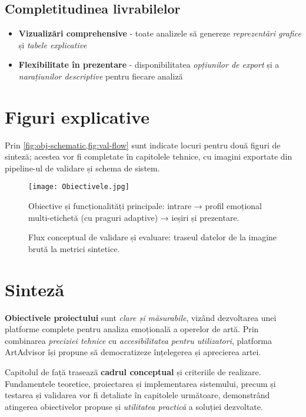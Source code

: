 \subsection{Completitudinea livrabilelor}
\begin{itemize}
  \item \textbf{Vizualizări comprehensive} - toate analizele să genereze \emph{reprezentări grafice} și \textit{tabele explicative}
  \item \textbf{Flexibilitate în prezentare} - disponibilitatea \emph{opțiunilor de export} și a \textit{narațiunilor descriptive} pentru fiecare analiză
\end{itemize}

\section{Figuri explicative}
\label{sec:figuri-explicative}

Prin \cref{fig:obj-schematic,fig:val-flow} sunt indicate locuri pentru două figuri de sinteză; acestea vor fi completate în capitolele tehnice, cu imagini exportate din pipeline-ul de validare și schema de sistem.

\begin{figure}[htbp]
  \centering
  \texttt{[image: Obiectivele.jpg]}
  \caption{Obiective și funcționalități principale: intrare → profil emoțional multi-etichetă (cu praguri adaptive) → ieșiri și prezentare.}
  \label{fig:obj-schematic}
\end{figure}

\begin{figure}[htbp]
  \centering
  \caption{Flux conceptual de validare și evaluare: traseul datelor de la imagine brută la metrici sintetice.}
  \label{fig:val-flow}
\end{figure}

\section{Sinteză}
\label{sec:obiective-sinteza}

\textbf{Obiectivele proiectului} sunt \emph{clare și măsurabile}, vizând dezvoltarea unei platforme complete pentru analiza emoțională a operelor de artă. Prin combinarea \textit{preciziei tehnice} cu \emph{accesibilitatea pentru utilizatori}, platforma ArtAdvisor își propune să democratizeze înțelegerea și aprecierea artei.

Capitolul de față trasează \textbf{cadrul conceptual} și criteriile de realizare. Fundamentele teoretice, proiectarea și implementarea sistemului, precum și testarea și validarea vor fi detaliate în capitolele următoare, demonstrând atingerea obiectivelor propuse și \textit{utilitatea practică} a soluției dezvoltate.


